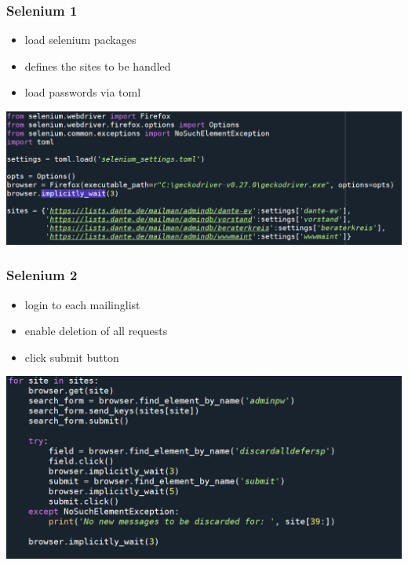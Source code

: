 \documentclass[12pt,ngerman]{beamer}
\begin{document}
\begin{frame}
\frametitle{Selenium 1}

\begin{itemize}
	\item load selenium packages
	\item defines the sites to be handled
	\item load passwords via toml
\end{itemize}

\begin{center}
\hspace*{-1em}\includegraphics[width=1.1\textwidth]{sel1}
\end{center}

\end{frame}

\begin{frame}
\frametitle{Selenium 2}

\begin{itemize}
	\item login to each mailinglist
	\item enable deletion of all requests
	\item click submit button
\end{itemize}\vspace*{-1em}


\begin{center}
\hspace*{-1em}\includegraphics[width=1.1\textwidth]{sel2}
\end{center}

\end{frame}
\end{document}
